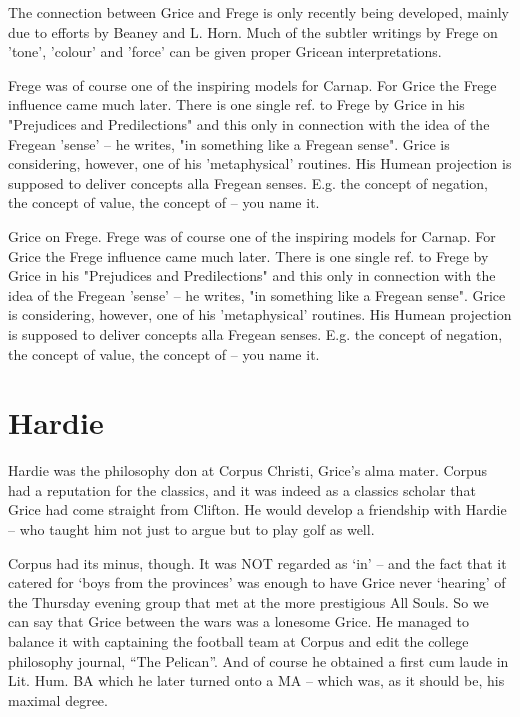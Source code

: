 \documentclass[10pt,titlepage]{book}
\begin{document}
{The connection between Grice and Frege is only recently being  
developed, mainly due to efforts by Beaney and L. Horn. Much of the subtler  
writings by Frege on 'tone', 'colour' and 'force' can be given proper Gricean  
interpretations.
 
Frege was of course one of the inspiring models for Carnap. For  Grice 
the Frege influence came much later. There is one single ref. to Frege by  
Grice in his "Prejudices and Predilections" and this only in connection with 
the  idea of the Fregean 'sense' -- he writes, "in something like a Fregean 
sense".  Grice is considering, however, one of his 'metaphysical' routines. 
His Humean  projection is supposed to deliver concepts alla Fregean senses. 
E.g. the concept  of negation, the concept of value, the concept of -- you 
name it.


Grice  on Frege. Frege was of course one of the inspiring models for 
Carnap. For  Grice the Frege influence came much later. There is one single ref. 
to Frege by  Grice in his "Prejudices and Predilections" and this only in 
connection with the  idea of the Fregean 'sense' -- he writes, "in something 
like a Fregean sense".  Grice is considering, however, one of his 
'metaphysical' routines. His Humean  projection is supposed to deliver concepts alla 
Fregean senses. E.g. the concept  of negation, the concept of value, the 
concept of -- you name  it. 


\section{Hardie}

Hardie was the philosophy don at Corpus Christi, Grice's alma mater.  
Corpus had a reputation for the classics, and it was indeed as a classics  
scholar that Grice had come straight from Clifton. He would develop a 
friendship  with Hardie -- who taught him not just to argue but to play golf as 
well.

Corpus had its minus, though.
It was NOT regarded as `in' -- and the fact that it catered for `boys from the provinces' was enough to have Grice never  `hearing' of the Thursday evening group that met at the more prestigious All Souls.
So we can say that Grice between the wars was a lonesome Grice.
He managed to balance it with captaining the football team at Corpus and edit the  college philosophy journal, ``The Pelican''.
And of course he obtained a first cum laude in Lit. Hum. BA which he later turned onto a MA -- which was, as it should  be, his maximal degree.

}
\end{document}
